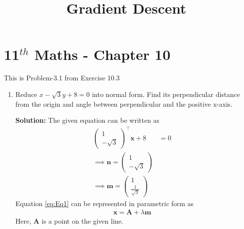 \documentclass[12pt]{article}
\newcommand{\solution}{\noindent \textbf{Solution: }}
\newcommand{\myvec}[1]{\ensuremath{\begin{pmatrix}#1\end{pmatrix}}}
\let\vec\mathbf
\begin{document}
\begin{center}
\title{\textbf{Gradient Descent}}
\date{\vspace{-5ex}} %
\maketitle
\end{center}
\setcounter{page}{1}

\section{11$^{th}$ Maths - Chapter 10}
This is Problem-3.1 from Exercise 10.3 
\begin{enumerate}
\item Reduce $x-\sqrt{3}y+8=0$ into normal form. Find its perpendicular distance from the origin and angle between perpendicular and the positive x-axis. 

\solution 
The given equation can be written as
\begin{align}
	\label{eq:Eq1}
	\myvec{1 \\ -\sqrt{3}}^\top\vec{x}+8 &= 0 \\
	\implies \vec{n} = \myvec{1 \\ -\sqrt{3}} \\
	\implies \vec{m} = \myvec{1 \\ \frac{1}{\sqrt{3}}}
\end{align}
Equation \eqref{eq:Eq1} can be represented in parametric form as
\begin{align}
	\label{eq:Eq2}
	\vec{x} = \vec{A}+\lambda\vec{m}
\end{align}
Here, $\vec{A}$ is a point on the given line. 


\end{enumerate}
\end{document}
